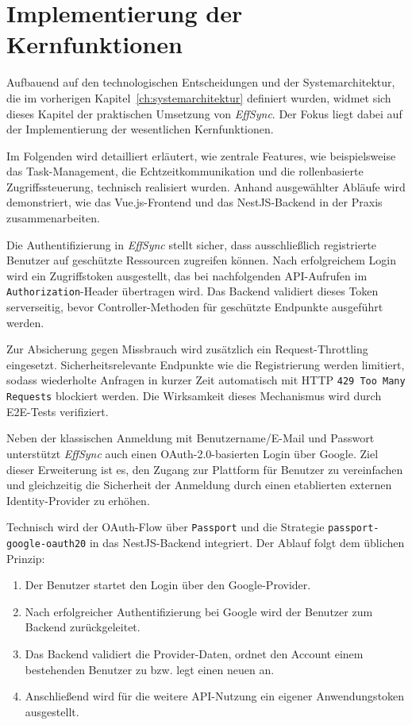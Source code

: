 \chapter{Implementierung der Kernfunktionen}
\label{ch:implementierung_kernfunktionen}
Aufbauend auf den technologischen Entscheidungen und der Systemarchitektur, die im vorherigen Kapitel~\ref{ch:systemarchitektur} definiert wurden, widmet sich dieses Kapitel der praktischen Umsetzung von \textit{EffSync}. Der Fokus liegt dabei auf der Implementierung der wesentlichen Kernfunktionen.

Im Folgenden wird detailliert erläutert, wie zentrale Features, wie beispielsweise das Task-Management, die Echtzeitkommunikation und die rollenbasierte Zugriffssteuerung, technisch realisiert wurden. Anhand ausgewählter Abläufe wird demonstriert, wie das Vue.js-Frontend und das NestJS-Backend in der Praxis zusammenarbeiten.

\label{sec:authentifizierung}
Die Authentifizierung in \textit{EffSync} stellt sicher, dass ausschließlich registrierte Benutzer auf geschützte Ressourcen zugreifen können. Nach erfolgreichem Login wird ein Zugriffstoken ausgestellt, das bei nachfolgenden API-Aufrufen im \texttt{Authorization}-Header übertragen wird. Das Backend validiert dieses Token serverseitig, bevor Controller-Methoden für geschützte Endpunkte ausgeführt werden.


Zur Absicherung gegen Missbrauch wird zusätzlich ein Request-Throttling eingesetzt. Sicherheitsrelevante Endpunkte wie die Registrierung werden limitiert, sodass wiederholte Anfragen in kurzer Zeit automatisch mit HTTP \texttt{429 Too Many Requests} blockiert werden. Die Wirksamkeit dieses Mechanismus wird durch E2E-Tests verifiziert.

Neben der klassischen Anmeldung mit Benutzername/E-Mail und Passwort unterstützt \textit{EffSync} auch einen OAuth-2.0-basierten Login über Google. Ziel dieser Erweiterung ist es, den Zugang zur Plattform für Benutzer zu vereinfachen und gleichzeitig die Sicherheit der Anmeldung durch einen etablierten externen Identity-Provider zu erhöhen.

Technisch wird der OAuth-Flow über \texttt{Passport} und die Strategie \texttt{passport-google-oauth20} in das NestJS-Backend integriert. Der Ablauf folgt dem üblichen Prinzip:
\begin{enumerate}
    \item Der Benutzer startet den Login über den Google-Provider.
    \item Nach erfolgreicher Authentifizierung bei Google wird der Benutzer zum Backend zurückgeleitet.
    \item Das Backend validiert die Provider-Daten, ordnet den Account einem bestehenden Benutzer zu bzw. legt einen neuen an.
    \item Anschließend wird für die weitere API-Nutzung ein eigener Anwendungstoken ausgestellt.
\end{enumerate}

